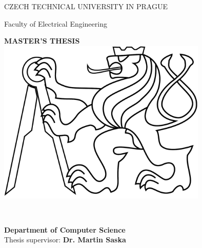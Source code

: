 \pagestyle{plain}

\begin{titlepage}
\begin{center}

{\Large CZECH TECHNICAL UNIVERSITY IN PRAGUE}
\vskip 10pt

\vskip 8pt
{\Large Faculty of Electrical Engineering}
 
\vspace{50pt}
{\Huge\bf MASTER'S THESIS}\\
\vspace{40pt}
\includegraphics[width=10cm]{fig/lev.pdf}

\vspace{40pt}
{\Large\rm \Author } \\
\vspace{20pt}
{\Large\bf \Title}

\vspace{60pt}
{\bf Department of Computer Science}\\
\vspace{5pt}   
{Thesis supervisor: {\bf Dr. Martin Saska}}

\vspace{30pt}
\end{center}
\end{titlepage}

\pagestyle{empty}